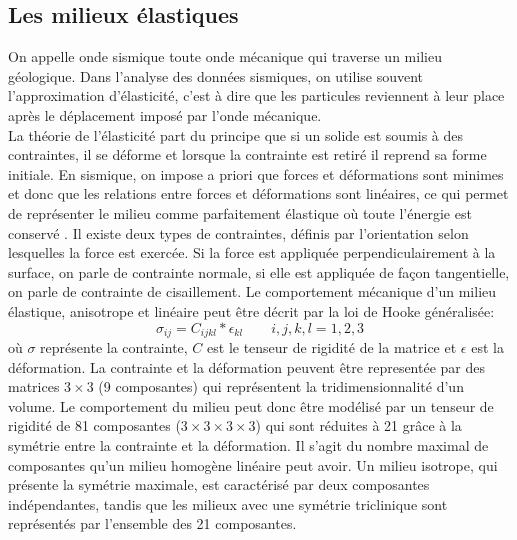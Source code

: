 \subsection{Les milieux élastiques}
 On appelle onde sismique toute onde mécanique qui traverse un milieu
géologique. Dans l'analyse des données sismiques, on utilise souvent
l'approximation d'élasticité, c'est à dire que les particules reviennent à leur
place après le déplacement imposé par l'onde mécanique.\\
La théorie de l'élasticité part du principe que si un solide est soumis à des
contraintes, il se déforme et lorsque la contrainte est retiré il reprend sa
forme initiale. En sismique, on impose a priori que forces et déformations
sont minimes et donc que les relations entre forces et déformations sont
linéaires, ce qui permet de représenter le milieu comme parfaitement élastique
où toute l'énergie est conservé \citep{Sheriff1995}. Il existe deux types de
contraintes, définis par l’orientation selon lesquelles la force est exercée. Si
la force est appliquée perpendiculairement à la surface, on parle de contrainte
normale, si elle est appliquée de façon tangentielle, on parle de contrainte de
cisaillement. Le comportement mécanique d’un milieu élastique, anisotrope et
linéaire peut être décrit par la loi de Hooke généralisée:
\begin{equation}
\sigma_{ij} = C_{ijkl}*\epsilon_{kl} \qquad i,j,k,l = 1,2,3
\label{eq:hooke}
\end{equation}
où $\sigma$ représente la contrainte, $C$ est le tenseur de rigidité de la
matrice et $\epsilon$ est la déformation.
La contrainte et la déformation peuvent être representée par des matrices $3
\times 3$ (9 composantes) qui représentent la tridimensionnalité d’un volume. Le
comportement du milieu peut donc être modélisé par un tenseur de rigidité de
81 composantes ($3 \times 3 \times 3 \times 3$) qui sont réduites à 21 grâce à
la symétrie entre la contrainte et la déformation. Il s’agit du nombre maximal
de composantes qu’un milieu homogène linéaire peut avoir. Un milieu isotrope,
qui présente la symétrie maximale, est caractérisé par deux composantes
indépendantes, tandis que les milieux avec une symétrie triclinique sont
représentés par l'ensemble des 21 composantes.\par

